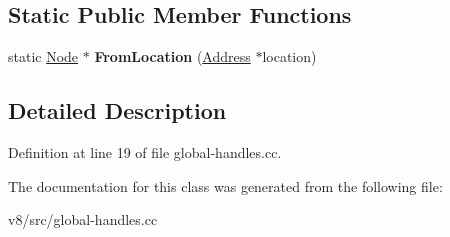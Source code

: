 \subsection*{Static Public Member Functions}
\begin{DoxyCompactItemize}
\item 
\mbox{\label{classv8_1_1internal_1_1GlobalHandles_1_1Node_aa19ff479cda8ee3088ee40082dd3ba6a}} 
static \mbox{\hyperlink{classv8_1_1internal_1_1GlobalHandles_1_1Node}{Node}} $\ast$ {\bfseries From\+Location} (\mbox{\hyperlink{classuintptr__t}{Address}} $\ast$location)
\end{DoxyCompactItemize}


\subsection{Detailed Description}


Definition at line 19 of file global-\/handles.\+cc.



The documentation for this class was generated from the following file\+:\begin{DoxyCompactItemize}
\item 
v8/src/global-\/handles.\+cc\end{DoxyCompactItemize}
